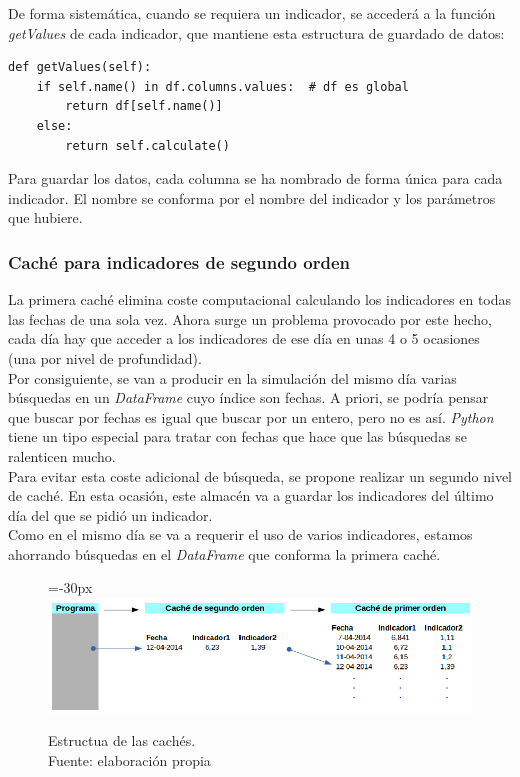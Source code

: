 De forma sistem\'atica, cuando se requiera un indicador, se acceder\'a a la funci\'on \textit{getValues} de cada indicador, que mantiene esta estructura de guardado de datos:\\

\begin{lstlisting}
def getValues(self):
	if self.name() in df.columns.values:  # df es global
		return df[self.name()]
	else:
		return self.calculate()
\end{lstlisting}

Para guardar los datos, cada columna se ha nombrado de forma \'unica para cada indicador. El nombre se conforma por el nombre del indicador y los par\'ametros que hubiere.\\

\subsubsection{Cach\'e para indicadores de segundo orden}

La primera cach\'e elimina coste computacional calculando los indicadores en todas las fechas de una sola vez. Ahora surge un problema provocado por este hecho, cada d\'ia hay que acceder a los indicadores de ese d\'ia en unas 4 o 5 ocasiones (una por nivel de profundidad).\\

Por consiguiente, se van a producir en la simulaci\'on del mismo d\'ia varias b\'usquedas en un \textit{DataFrame} cuyo \'indice son fechas. A priori, se podr\'ia pensar que buscar por fechas es igual que buscar por un entero, pero no es as\'i. \textit{Python} tiene un tipo especial para tratar con fechas que hace que las b\'usquedas se ralenticen mucho.\\

Para evitar esta coste adicional de b\'usqueda, se propone realizar un segundo nivel de cach\'e. En esta ocasi\'on, este almac\'en va a guardar los indicadores del \'ultimo d\'ia del que se pidi\'o un indicador. \\

Como en el mismo d\'ia se va a requerir el uso de varios indicadores, estamos ahorrando b\'usquedas en el \textit{DataFrame} que conforma la primera cach\'e.\\

     	\begin{figure}[H]
    		\centering\leftskip=-30px
    		\includegraphics[scale=0.60]{imagenes/caches.png}
    	    \caption[Estructura de las cach\'es]{Estructua de las cach\'es.\\ Fuente: elaboraci\'on propia}
    		\label{fig:caches}
	   \end{figure}
	   
